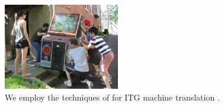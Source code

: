\documentclass[10pt]{sigplanconf}
\begin{document}
\begin{figure}[h]
	\begin{center}
	\includegraphics[width=0.45\textwidth]{machine-translation.jpg}
	\end{center}
	\caption{We employ the techniques of \cite{deltax} for ITG machine translation \cite{itg-translation1,itg-translation2}.} %
	\label{fig:machine-translation}
\end{figure}


\end{document}
